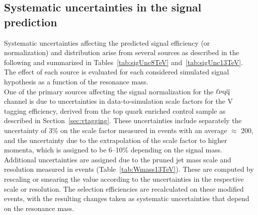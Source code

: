 \subsection{Systematic uncertainties in the signal prediction}\label{subsec:uncSig}

Systematic uncertainties affecting the predicted signal efficiency (or normalization) and \mlvj distribution arise from several sources as described in the following and summarized in Tables~\ref{tab:sigUnc8TeV} and~\ref{tab:sigUnc13TeV}.
The effect of each source is evaluated for each considered simulated signal hypothesis as a function of the resonance mass.\\

One of the primary sources affecting the signal normalization for the $\ell\nu\mathrm{q}\overline{\mathrm{q}}$ channel is due to uncertainties in data-to-simulation scale factors for the V tagging efficiency, derived from the top quark enriched control sample as described in Section~\ref{sec:vtagging}. These uncertainties include separately the uncertainty of 3\% on the scale factor measured in \ttbar events with an average \pt $\approx$ 200\GeV, and the uncertainty due to the extrapolation of the scale factor to higher momenta, which is assigned to be 6--10\% depending on the signal mass. Additional uncertainties are assigned due to the pruned jet mass scale and resolution measured in \ttbar events (Table~\ref{tab:Wmass13TeV}). These are computed by rescaling or smearing the \mJ value according to the uncertainties in the respective \mJ scale or resolution. The selection efficiencies are recalculated on these modified events, with the resulting changes taken as systematic uncertainties that depend on the resonance mass.

